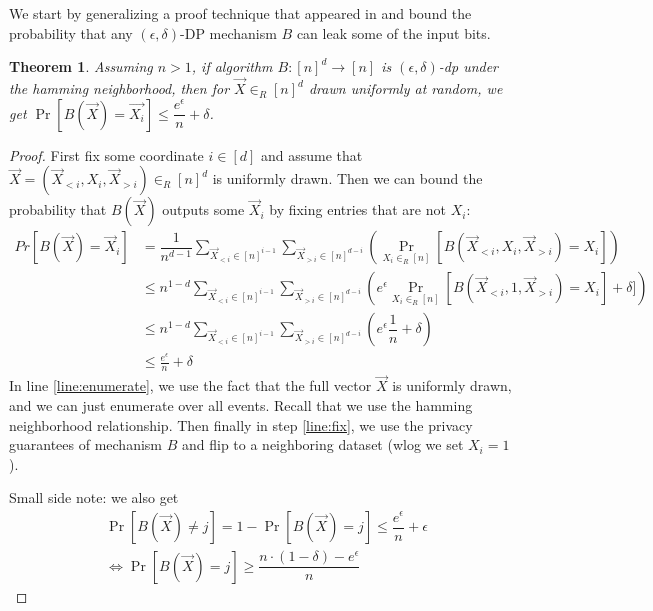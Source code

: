 \documentclass{article}
\newtheorem{theorem}{Theorem}[section]
\begin{document}
We start by generalizing a proof technique that appeared in \cite{sealfon_shortest_2016} and bound the probability that any $(\epsilon, \delta)$-DP mechanism $B$ can leak some of the input bits.



\begin{theorem}
Assuming $n>1$, if algorithm $B:[n]^{d} \rightarrow [n]$ is  $(\epsilon, \delta)$-dp under the hamming neighborhood, then for $\vec{X} \in_R [n]^d$ drawn uniformly at random, we get $\Pr\left[B(\vec{X}) = \vec{X_i}\right]\leq\dfrac{e^\epsilon}{n} + \delta$.
\end{theorem}
\begin{proof}
First fix some coordinate $i\in [d]$ and  assume that $\vec{X} = (\vec{X}_{<i}, X_i, \vec{X}_{>i}) \in_{R} [n]^d$ is uniformly drawn.
Then we can bound the probability that $B(\vec{X})$ outputs some $\vec{X}_i$ by fixing entries that are not $X_i$:
\begin{align}
Pr[B(\vec{X}) = \vec{X}_i] &= 
\dfrac{1}{n^{d-1}}\sum_{\vec{X}_{<i}\in [n]^{i-1}} 
\sum_{\vec{X}_{>i} \in [n]^{d-i}}\left(\Pr_{X_i \in_R [n]}\left[B(\vec{X}_{<i},X_i,\vec{X}_{>i})= X_i\right]\right)\\
& \leq n^{1-d}\sum_{\vec{X}_{<i}\in [n]^{i-1}} \label{line:enumerate}
\sum_{\vec{X}_{>i} \in [n]^{d-i}}\left(e^\epsilon \Pr_{X_i \in_R [n]}\left[B(\vec{X}_{<i},1,\vec{X}_{>i})= X_i\right] + \delta]\right)\\
& \leq n^{1-d}\sum_{\vec{X}_{<i}\in [n]^{i-1}}  \sum_{\vec{X}_{>i} \in [n]^{d-i}}\left(e^\epsilon \dfrac{1}{n} + \delta\right)\label{line:fix}\\
&\leq \frac{e^\epsilon}{n}+ \delta
\end{align}
In line \ref{line:enumerate}, we use the fact that the full vector $\vec{X}$ is uniformly drawn, and we can just enumerate over all events.
Recall that we use the hamming neighborhood relationship.
Then finally in step \ref{line:fix}, we use the privacy guarantees of mechanism $B$ and flip to a neighboring dataset (wlog we set $X_i = 1$).

Small side note: we also get
\begin{align*}
& \Pr[B(\vec{X}) \neq j] = 1 - \Pr[B(\vec{X}) = j] \leq \dfrac{e^\epsilon}{n} + \epsilon \\
&\Leftrightarrow  \Pr[B(\vec{X}) = j] \geq \dfrac{n \cdot (1-\delta)-e^\epsilon}{n}
\end{align*}
\end{proof}
\end{document}
